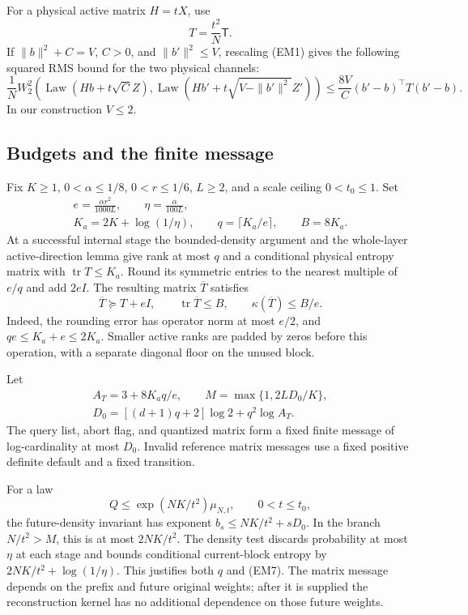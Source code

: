 For a physical active matrix $H=tX$, use
\[
 T=\frac{t^2}{N}\mathsf T.
\]
If $\|b\|^2+C=V$, $C>0$, and $\|b'\|^2\le V$, rescaling (EM1)
gives the following squared RMS bound for the two physical channels:
\[
 \frac1N W_2^2\left(
 \operatorname{Law}(Hb+t\sqrt C Z),
 \operatorname{Law}(Hb'+t\sqrt{V-\|b'\|^2}Z')\right)
 \le\frac{8V}{C}(b'-b)^\top T(b'-b).
 \tag{EM5}
\]
In our construction $V\le2$.

\subsection{Budgets and the finite message}

Fix $K\ge1$, $0<\alpha\le1/8$, $0<r\le1/6$, $L\ge2$,
and a scale ceiling $0<t_0\le1$. Set
\[
 \begin{gathered}
 e=\frac{\alpha r^2}{1000L},\qquad
 \eta=\frac{\alpha}{100L},\\
 K_a=2K+\log(1/\eta),\qquad q=\lceil K_a/e\rceil,
 \qquad B=8K_a.
 \end{gathered}
 \tag{EM6}
\]
At a successful internal stage the bounded-density argument and the
whole-layer active-direction lemma give rank at most $q$ and a
conditional physical entropy matrix with $\operatorname{tr}T\le K_a$.
Round its symmetric entries to the nearest multiple of $e/q$ and add
$2eI$. The resulting matrix $\overline T$ satisfies
\[
 \overline T\succeq T+eI,\qquad
 \operatorname{tr}\overline T\le B,\qquad
 \kappa(\overline T)\le B/e.
 \tag{EM7}
\]
Indeed, the rounding error has operator norm at most $e/2$, and
$qe\le K_a+e\le2K_a$. Smaller active ranks are padded by zeros before
this operation, with a separate diagonal floor on the unused block.

Let
\[
 \begin{gathered}
 A_T=3+8K_aq/e,\qquad M=\max\{1,2LD_0/K\},\\
 D_0=[(d+1)q+2]\log2+q^2\log A_T.
 \end{gathered}
 \tag{EM8}
\]
The query list, abort flag, and quantized matrix form a fixed finite
message of log-cardinality at most $D_0$. Invalid reference matrix
messages use a fixed positive definite default and a fixed transition.

For a law
\[
 Q\le\exp(NK/t^2)\mu_{N,t},\qquad 0<t\le t_0,
 \tag{EM9}
\]
the future-density invariant has exponent
$b_s\le NK/t^2+sD_0$. In the branch $N/t^2>M$, this is at most
$2NK/t^2$. The density test discards probability at most $\eta$ at
each stage and bounds conditional current-block entropy by
$2NK/t^2+\log(1/\eta)$. This justifies both $q$ and (EM7).
The matrix message depends on the prefix and future original weights;
after it is supplied the reconstruction kernel has no additional
dependence on those future weights.

